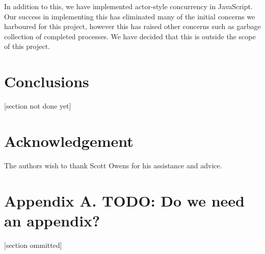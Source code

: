 \documentclass[twoside,12pt,titlepage,a4paper]{article}
\begin{document}
In addition to this, we have implemented actor-style concurrency in JavaScript. Our success in implementing this has eliminated many of the initial concerns we harboured for this project, however this has raised other concerns such as garbage collection of completed processes. We have decided that this is outside the scope of this project.

\section{Conclusions}
\label{Conclusions}

 [section not done yet]

\section{Acknowledgement}
The authors wish to thank Scott Owens for his assistance
and advice.

\appendix
\section*{Appendix A. TODO: Do we need an appendix?}


[section ommitted]



\vskip 0.2in


\end{document}
